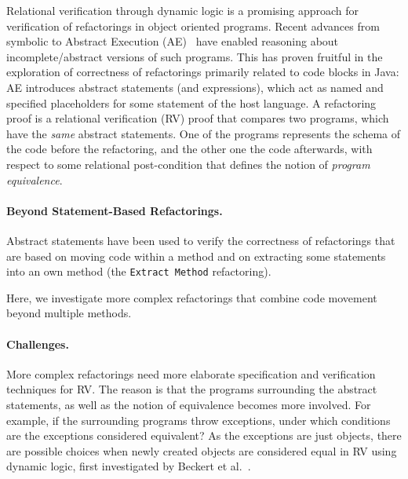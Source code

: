 
Relational verification through dynamic logic is a promising approach for verification of refactorings in object oriented programs.
Recent advances from symbolic to Abstract Execution (AE)~\cite{DBLP:conf/fm/SteinhofelH19} have enabled reasoning about incomplete/abstract versions of such programs.
This has proven fruitful in the exploration of correctness of refactorings primarily related to code blocks in Java:
%
AE introduces abstract statements (and expressions), which act as named and specified placeholders for some statement of the host language.
A refactoring proof is a relational verification (RV) proof that compares two programs, which have the \emph{same} abstract statements. One of the programs represents the schema of the code before the refactoring, and the other one the code afterwards, with respect to some relational post-condition that defines the notion of \emph{program equivalence}.

\paragraph{Beyond Statement-Based Refactorings.}
Abstract statements have been used to verify the correctness of refactorings that are based on moving code within a method and on extracting some statements into an own method (the \texttt{Extract Method} refactoring). 


Here, we investigate more complex refactorings that combine code movement beyond multiple methods. 


\paragraph{Challenges.}
More complex refactorings need more elaborate specification and verification techniques for RV. 
The reason is that the programs surrounding the abstract statements, as well as the notion of equivalence becomes more involved.
For example, if the surrounding programs throw exceptions, under which conditions are the exceptions considered equivalent? 
As the exceptions are just objects, there are possible choices when newly created objects are considered equal in RV using dynamic logic, 
first investigated by Beckert et al.~\cite{DBLP:conf/lopstr/BeckertBKSSU13}.



